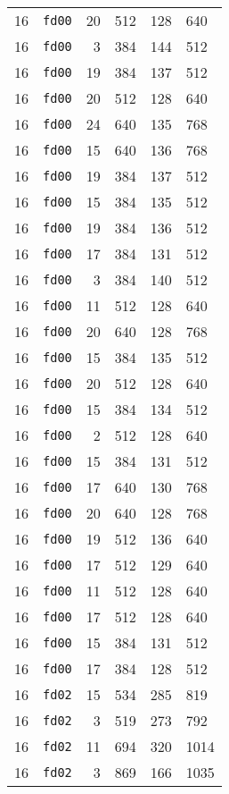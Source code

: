 \documentclass{article}
\begin{document}
\begin{table}[h!]
\begin{tabular}{llrrrl}
    16 & \texttt{fd00} & 20 & 512 & 128 & 640 \\
    16 & \texttt{fd00} & 3 & 384 & 144 & 512 \\
    16 & \texttt{fd00} & 19 & 384 & 137 & 512 \\
    16 & \texttt{fd00} & 20 & 512 & 128 & 640 \\
    16 & \texttt{fd00} & 24 & 640 & 135 & 768 \\
    16 & \texttt{fd00} & 15 & 640 & 136 & 768 \\
    16 & \texttt{fd00} & 19 & 384 & 137 & 512 \\
    16 & \texttt{fd00} & 15 & 384 & 135 & 512 \\
    16 & \texttt{fd00} & 19 & 384 & 136 & 512 \\
    16 & \texttt{fd00} & 17 & 384 & 131 & 512 \\
    16 & \texttt{fd00} & 3 & 384 & 140 & 512 \\
    16 & \texttt{fd00} & 11 & 512 & 128 & 640 \\
    16 & \texttt{fd00} & 20 & 640 & 128 & 768 \\
    16 & \texttt{fd00} & 15 & 384 & 135 & 512 \\
    16 & \texttt{fd00} & 20 & 512 & 128 & 640 \\
    16 & \texttt{fd00} & 15 & 384 & 134 & 512 \\
    16 & \texttt{fd00} & 2 & 512 & 128 & 640 \\
    16 & \texttt{fd00} & 15 & 384 & 131 & 512 \\
    16 & \texttt{fd00} & 17 & 640 & 130 & 768 \\
    16 & \texttt{fd00} & 20 & 640 & 128 & 768 \\
    16 & \texttt{fd00} & 19 & 512 & 136 & 640 \\
    16 & \texttt{fd00} & 17 & 512 & 129 & 640 \\
    16 & \texttt{fd00} & 11 & 512 & 128 & 640 \\
    16 & \texttt{fd00} & 17 & 512 & 128 & 640 \\
    16 & \texttt{fd00} & 15 & 384 & 131 & 512 \\
    16 & \texttt{fd00} & 17 & 384 & 128 & 512 \\
    16 & \texttt{fd02} & 15 & 534 & 285 & 819 \\
    16 & \texttt{fd02} & 3 & 519 & 273 & 792 \\
    16 & \texttt{fd02} & 11 & 694 & 320 & 1014 \\
    16 & \texttt{fd02} & 3 & 869 & 166 & 1035 \\

\end{tabular}
\end{table}
\end{document}
